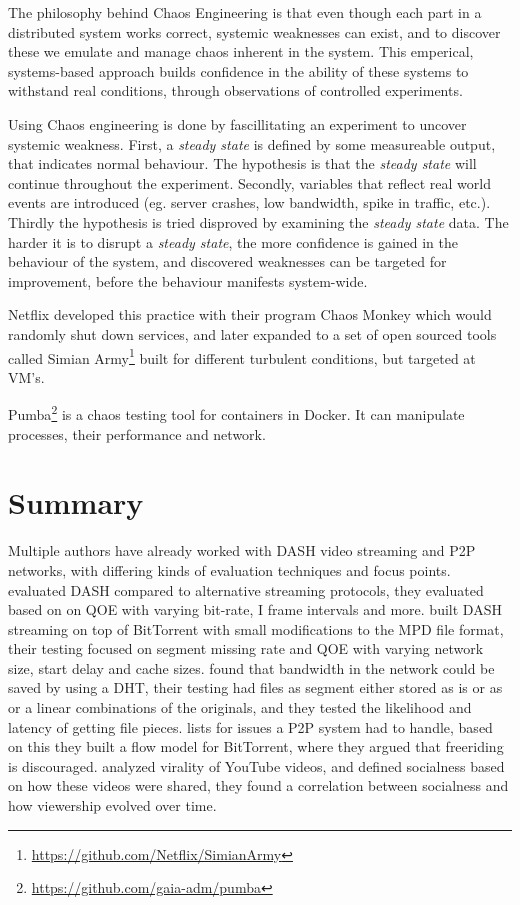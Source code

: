 The philosophy behind Chaos Engineering is that even though each part in a distributed system works correct, systemic weaknesses can exist, and to discover these we emulate and manage chaos inherent in the system. This emperical, systems-based approach builds confidence in the ability of these systems to withstand real conditions, through observations of controlled experiments.

Using Chaos engineering is done by fascillitating an experiment to uncover systemic weakness.
First, a \emph{steady state} is defined by some measureable output, that indicates normal behaviour. The hypothesis is that the \emph{steady state} will continue throughout the experiment.
Secondly, variables that reflect real world events are introduced (eg. server crashes, low bandwidth, spike in traffic, etc.).
Thirdly the hypothesis is tried disproved by examining the \emph{steady state} data.
The harder it is to disrupt a \emph{steady state}, the more confidence is gained in the behaviour of the system, and discovered weaknesses can be targeted for improvement, before the behaviour manifests system-wide.

Netflix developed this practice with their program Chaos Monkey which would randomly shut down services, and later expanded to a set of open sourced tools called Simian Army\footnote{\url{https://github.com/Netflix/SimianArmy}} built for different turbulent conditions, but targeted at \ac{VM}'s.

Pumba\footnote{\url{https://github.com/gaia-adm/pumba}} is a chaos testing tool for containers in Docker. It can manipulate processes, their performance and network.

\section{Summary}
Multiple authors have already worked with \ac{DASH} video streaming and \ac{P2P} networks, with differing kinds of evaluation techniques and focus points.\\
\citeauthor{aloman2015performance} evaluated \ac{DASH} compared to alternative streaming protocols, they evaluated based on on \ac{QOE} with varying bit-rate, I frame intervals and more. \citeauthor{gazdar2017toward} built \ac{DASH} streaming on top of BitTorrent with small modifications to the \ac{MPD} file format, their testing focused on segment missing rate and \ac{QOE} with varying network size, start delay and cache sizes. \citeauthor{nguyen2009p2p} found that bandwidth in the network could be saved by using a \ac{DHT}, their testing had files as segment either stored as is or as or a linear combinations of the originals, and they tested the likelihood and latency of getting file pieces. \citeauthor{qiu2004modeling} lists for issues a \ac{P2P} system had to handle, based on this they built a flow model for BitTorrent, where they argued that freeriding is discouraged. \citeauthor{broxton2013catching} analyzed virality of YouTube videos, and defined socialness based on how these videos were shared, they found a correlation between socialness and how viewership evolved over time.

